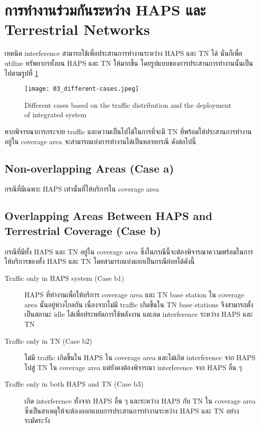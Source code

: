 \section{การทำงานร่วมกันระหว่าง HAPS และ Terrestrial Networks}

เทคนิค interference สามารถใช้เพื่อประสานการทำงานระหว่าง HAPS และ TN ได้
นั่นก็เพื่อ utilize ทรัพยากรทั้งบน HAPS และ TN ให้มากขึ้น
โดยรูปแบบของการประสานการทำงานนั้นเป็นไปตามรูปที่ \ref{fig:03-different-cases}

\begin{figure}[h]
\centering
\caption[Different interference cases]{Different cases based on the traffic distribution and the deployment of integrated system} \label{fig:03-different-cases}
\texttt{[image: 03\_different-cases.jpeg]}
\end{figure}

หากพิจารณาการกระจาย traffic และความเป็นไปได้ในการที่จะมี TN ที่พร้อมให้ประสานการทำงานอยู่ใน coverage area
จะสามารถแบ่งการทำงานได้เป็นหลายกรณี ดังต่อไปนี้

\subsection{Non-overlapping Areas (Case a)}

กรณีที่มีเฉพาะ HAPS เท่านั้นที่ให้บริการใน coverage area

\subsection{Overlapping Areas Between HAPS and Terrestrial Coverage (Case b)}

กรณีที่มีทั้ง HAPS และ TN อยู่ใน coverage area ซึ่งในกรณีนี้จะต้องพิจารณาความพร้อมในการให้บริการของทั้ง
HAPS และ TN โดยสามารถแบ่งแยกเป็นกรณีย่อยได้ดังนี้

\begin{description}
    \item[Traffic only in HAPS system (Case b1)] HAPS ที่ทำงานเพื่อให้บริการ coverage area และ TN base station ใน coverage area นั้นอยู่ห่างไกลกัน
เนื่องจากไม่มี traffic เกิดขึ้นใน TN base stations จึงสามารถตั้งเป็นสถานะ idle ได้เพื่อประหยัดการใช้พลังงาน
และลด interference ระหว่าง HAPS และ TN
    \item[Traffic only in TN (Case b2)] ไม่มี traffic เกิดขึ้นใน HAPS ใน coverage area และไม่เกิด interference จาก HAPS ไปสู่ TN ใน coverage area
แต่ยังคงต้องพิจารณา interference จาก HAPS อื่น ๆ
    \item[Traffic only in both HAPS and TN (Case b3)] เกิด interference ทั้งจาก HAPS อื่น ๆ และระหว่าง HAPS กับ TN ใน coverage area
ซึ่งเป็นสาเหตุให้จะต้องออกแบบการประสานการทำงานระหว่าง HAPS และ TN อย่างระมัดระวัง
\end{description}
